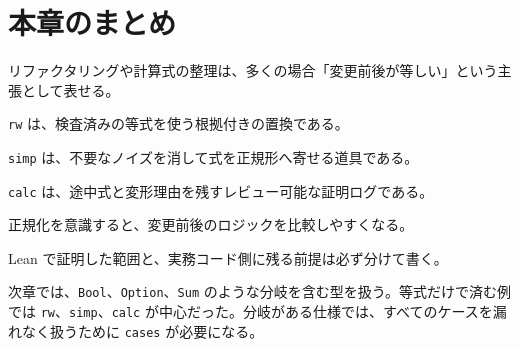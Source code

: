 \section{本章のまとめ}

リファクタリングや計算式の整理は、多くの場合「変更前後が等しい」という主張として表せる。

\texttt{rw} は、検査済みの等式を使う根拠付きの置換である。

\texttt{simp} は、不要なノイズを消して式を正規形へ寄せる道具である。

\texttt{calc} は、途中式と変形理由を残すレビュー可能な証明ログである。

正規化を意識すると、変更前後のロジックを比較しやすくなる。

Lean で証明した範囲と、実務コード側に残る前提は必ず分けて書く。

次章では、\texttt{Bool}、\texttt{Option}、\texttt{Sum} のような分岐を含む型を扱う。等式だけで済む例では \texttt{rw}、\texttt{simp}、\texttt{calc} が中心だった。分岐がある仕様では、すべてのケースを漏れなく扱うために \texttt{cases} が必要になる。
